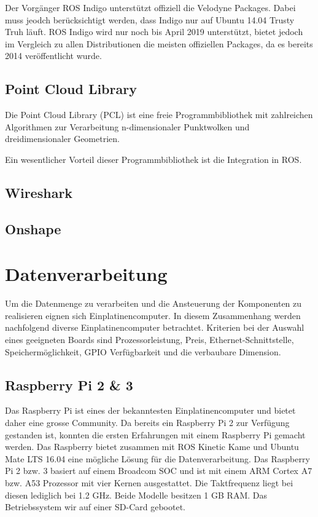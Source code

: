Der Vorgänger ROS Indigo unterstützt offiziell die Velodyne Packages. Dabei muss jeodch berücksichtigt werden, dass Indigo nur auf Ubuntu 14.04 Trusty Truh läuft. ROS Indigo wird nur noch bis April 2019 unterstützt, bietet jedoch im Vergleich zu allen Distributionen die meisten offiziellen Packages, da es bereits 2014 veröffentlicht wurde. 
 
\subsection{Point Cloud Library}
\label{subsec:PointCloudLibrary}
Die Point Cloud Library (PCL) ist eine freie Programmbibliothek mit zahlreichen Algorithmen zur Verarbeitung n-dimensionaler Punktwolken und dreidimensionaler Geometrien.

Ein wesentlicher Vorteil dieser Programmbibliothek ist die Integration in ROS.
\subsection{Wireshark}
\label{subcec_Wirehark}
\subsection{Onshape}
\label{subsec:OnShape}

\section{Datenverarbeitung}
\label{sec:Datenverarbeitung}
Um die Datenmenge zu verarbeiten und die Ansteuerung der Komponenten zu realisieren eignen sich Einplatinencomputer. In diesem Zusammenhang werden nachfolgend diverse Einplatinencomputer betrachtet. Kriterien bei der Auswahl eines geeigneten Boards sind Prozessorleistung, Preis, Ethernet-Schnittstelle, Speichermöglichkeit, GPIO Verfügbarkeit und die verbaubare Dimension. 

\subsection{Raspberry Pi 2 \& 3}
\label{subsec:Raspberry}
Das Raspberry Pi ist eines der bekanntesten Einplatinencomputer und bietet daher eine grosse Community. Da bereits ein Raspberry Pi 2 zur Verfügung gestanden ist, konnten die ersten Erfahrungen mit einem Raspberry Pi gemacht werden. Das Raspberry bietet zusammen mit ROS Kinetic Kame und Ubuntu Mate LTS 16.04 eine mögliche Lösung für die Datenverarbeitung. Das Raspberry Pi 2 bzw. 3 basiert auf einem Broadcom \ac{SOC} und ist mit einem ARM Cortex A7 bzw. A53 Prozessor mit vier Kernen ausgestattet. Die Taktfrequenz liegt bei diesen lediglich bei 1.2 GHz. Beide Modelle besitzen 1 GB RAM. Das Betriebssystem wir auf einer \ac{SD}-Card gebootet.

